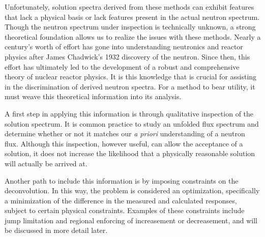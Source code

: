 Unfortunately, solution spectra derived from these methods can exhibit features that lack a physical basis or lack features present in the actual neutron spectrum.
Though the neutron spectrum under inspection is technically unknown, a strong theoretical foundation allows us to realize the issues with these methods.
Nearly a century's worth of effort has gone into understanding neutronics and reactor physics after James Chadwick's 1932 discovery of the neutron.
Since then, this effort has ultimately led to the development of a robust and comprehensive theory of nuclear reactor physics.
It is this knowledge that is crucial for assisting in the discrimination of derived neutron spectra.
For a method to bear utility, it must weave this theoretical information into its analysis.

A first step in applying this information is through qualitative inspection of the solution spectrum.
It is common practice to study an unfolded flux spectrum and determine whether or not it matches our {\it a priori} understanding of a neutron flux.
Although this inspection, however useful, can allow the acceptance of a solution, it does not increase the likelihood that a physically reasonable solution will actually be arrived at.

Another path to include this information is by imposing constraints on the deconvolution.
In this way, the problem is considered an optimization, specifically a minimization of the difference in the measured and calculated responses, subject to certain physical constraints.
Examples of these constraints include jump limitation and regional enforcing of increasement or decreasement, and will be discussed in more detail later.

